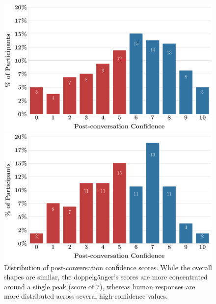 \begin{figure}[ht!]
	\centering
	\begin{minipage}{0.48\textwidth}
		\centering
		\includegraphics[width=\linewidth]{fig/post-conf-human.pdf}
	\end{minipage}\hfill
	\begin{minipage}{0.49\textwidth}
		\centering
		\includegraphics[width=\linewidth]{fig/post-conf-gpt4-o.pdf}
	\end{minipage}
	\caption{Distribution of post-conversation confidence scores. While the overall shapes are similar, the doppelgänger's scores are more concentrated around a single peak (score of 7), whereas human responses are more distributed across several high-confidence values.}
	\label{fig:post_conf_distributions}
\end{figure}

